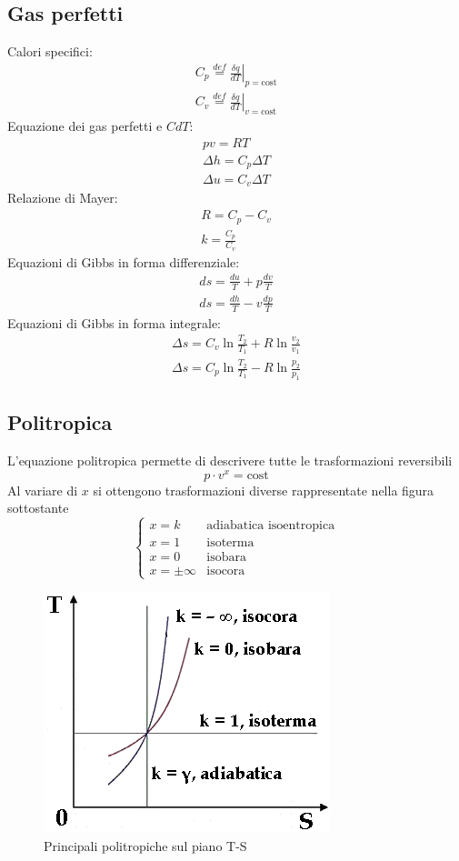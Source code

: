 \documentclass[a4paper,12pt]{article}
\begin{document}
\subsection{Gas perfetti}
Calori specifici:
\begin{gather}
    C_p \stackrel{def}{=} \left.\frac{\delta q}{dT}\right|_{p=\text{cost}}\\
    C_v \stackrel{def}{=} \left.\frac{\delta q}{dT}\right|_{v=\text{cost}}
\end{gather}
Equazione dei gas perfetti e \(CdT\):
\begin{gather}
    pv=RT\\
    \Delta h=C_p\Delta T\\
    \Delta u=C_v\Delta T
\end{gather}
Relazione di Mayer:
\begin{gather}
    R = C_p - C_v\\
    k = \frac{C_p}{C_v}
\end{gather}
Equazioni di Gibbs in forma differenziale:
\begin{gather}
    ds = \frac{du}{T} + p\frac{dv}{T}\\
    ds = \frac{dh}{T} - v\frac{dp}{T}
\end{gather}
Equazioni di Gibbs in forma integrale:
\begin{gather}
    \Delta s = C_v \ln{\frac{T_2}{T_1}} + R \ln{\frac{v_2}{v_1}} \\
    \Delta s = C_p \ln{\frac{T_2}{T_1}} - R \ln{\frac{p_2}{p_1}}
\end{gather}
\subsection{Politropica}
\label{subsec:politropica}
L'equazione politropica permette di descrivere tutte le trasformazioni reversibili
\begin{equation}
    \label{eq:politropica}
     p\cdot v^x=\text{cost}
\end{equation}
Al variare di \(x\) si ottengono trasformazioni diverse rappresentate nella figura 
sottostante
\[\begin{cases}
    x=k & \text{adiabatica isoentropica}\\
    x=1 & \text{isoterma}\\
    x=0 & \text{isobara}\\
    x=\pm\infty & \text{isocora}
\end{cases}\]
\begin{figure}[H]
    \label{fig:politropiche}
    \centering
    \includegraphics[width=0.5\linewidth]{media/politropiche.png}
    \caption{Principali politropiche sul piano T-S}
\end{figure}
\end{document}
